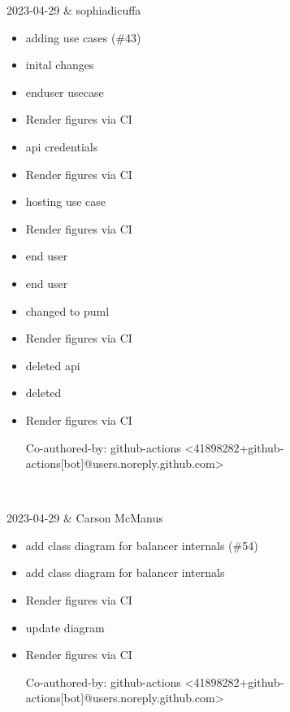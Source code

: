 2023-04-29 & sophiadicuffa
\begin{itemize}[topsep=0pt,itemsep=0pt,parsep=0pt,partopsep=0pt,leftmargin=12pt]
\item adding use cases (\#43)

\item inital changes

\item enduser usecase

\item Render figures via CI

\item api credentials

\item Render figures via CI

\item hosting use case

\item Render figures via CI

\item end user

\item end user

\item changed to puml

\item Render figures via CI

\item deleted api

\item deleted

\item Render figures via CI



Co-authored-by: github-actions <41898282+github-actions[bot]@users.noreply.github.com>
\end{itemize}
\\ \hline

2023-04-29 & Carson McManus
\begin{itemize}[topsep=0pt,itemsep=0pt,parsep=0pt,partopsep=0pt,leftmargin=12pt]
\item add class diagram for balancer internals (\#54)

\item add class diagram for balancer internals

\item Render figures via CI

\item update diagram

\item Render figures via CI



Co-authored-by: github-actions <41898282+github-actions[bot]@users.noreply.github.com>
\end{itemize}
\\ \hline

